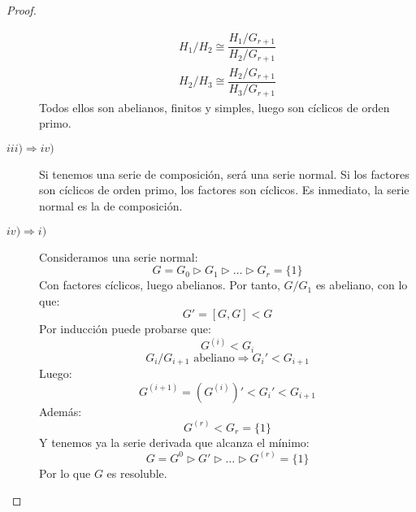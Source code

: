 \begin{teo}
\begin{proof}
\begin{description}
\begin{gather*}
                    H_1/H_2 \cong \dfrac{H_1/G_{r+1}}{H_2/G_{r+1}} \\
                    H_2/H_3 \cong \dfrac{H_2/G_{r+1}}{H_3/G_{r+1}}
                \end{gather*}
                Todos ellos son abelianos, finitos y simples, luego son cíclicos de orden primo. %
            \item [$iii) \Longrightarrow iv)$] Si tenemos una serie de composición, será una serie normal. Si los factores son cíclicos de orden primo, los factores son cíclicos. Es inmediato, la serie normal es la de composición.
            \item [$iv) \Longrightarrow i)$] Consideramos una serie normal:
                \begin{equation*}
                    G = G_0 \rhd G_1 \rhd \ldots \rhd G_r = \{1\}
                \end{equation*}
                Con factores cíclicos, luego abelianos. Por tanto, $G/G_1$ es abeliano, con lo que:
                \begin{equation*}
                    G' = [G,G] < G
                \end{equation*}
                Por inducción puede probarse que:
                \begin{equation*}
                    G^{(i)} < G_i
                \end{equation*}
                \begin{equation*}
                    G_i/G_{i+1} \text{\ abeliano} \Longrightarrow G_i' < G_{i+1}
                \end{equation*}
                Luego:
                \begin{equation*}
                    G^{(i+1)} = (G^{(i)})' < G_i' < G_{i+1}
                \end{equation*}
                Además:
                \begin{equation*}
                    G^{(r)} < G_r = \{1\}
                \end{equation*}
                Y tenemos ya la serie derivada que alcanza el mínimo:
                \begin{equation*}
                    G = G^0 \rhd G' \rhd \ldots \rhd G^{(r)} = \{1\}
                \end{equation*}
                Por lo que $G$ es resoluble.
        \end{description}
    \end{proof}
\end{teo}

